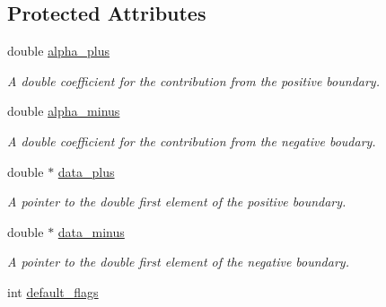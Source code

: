 \subsection*{Protected Attributes}
\begin{DoxyCompactItemize}
\item 
\hypertarget{classboundary_1_1boundary_a8e358b93badffa81343aea35bbe351c0}{double \hyperlink{classboundary_1_1boundary_a8e358b93badffa81343aea35bbe351c0}{alpha\-\_\-plus}}\label{classboundary_1_1boundary_a8e358b93badffa81343aea35bbe351c0}

\begin{DoxyCompactList}\small\item\em A double coefficient for the contribution from the positive boundary. \end{DoxyCompactList}\item 
\hypertarget{classboundary_1_1boundary_aaa0ab185e8c6c7d784799479fdeaae44}{double \hyperlink{classboundary_1_1boundary_aaa0ab185e8c6c7d784799479fdeaae44}{alpha\-\_\-minus}}\label{classboundary_1_1boundary_aaa0ab185e8c6c7d784799479fdeaae44}

\begin{DoxyCompactList}\small\item\em A double coefficient for the contribution from the negative boudary. \end{DoxyCompactList}\item 
\hypertarget{classboundary_1_1boundary_a8aeb4adf7f12086bd78adc5445f4c757}{double $\ast$ \hyperlink{classboundary_1_1boundary_a8aeb4adf7f12086bd78adc5445f4c757}{data\-\_\-plus}}\label{classboundary_1_1boundary_a8aeb4adf7f12086bd78adc5445f4c757}

\begin{DoxyCompactList}\small\item\em A pointer to the double first element of the positive boundary. \end{DoxyCompactList}\item 
\hypertarget{classboundary_1_1boundary_a38706e972e08a232bdb4bf3d57490ab6}{double $\ast$ \hyperlink{classboundary_1_1boundary_a38706e972e08a232bdb4bf3d57490ab6}{data\-\_\-minus}}\label{classboundary_1_1boundary_a38706e972e08a232bdb4bf3d57490ab6}

\begin{DoxyCompactList}\small\item\em A pointer to the double first element of the negative boundary. \end{DoxyCompactList}\item 
\hypertarget{classplan_a14f8cce3065ed97f0909eda7b62ca1dc}{int \hyperlink{classplan_a14f8cce3065ed97f0909eda7b62ca1dc}{default\-\_\-flags}}\label{classplan_a14f8cce3065ed97f0909eda7b62ca1dc}


\end{DoxyCompactItemize}
